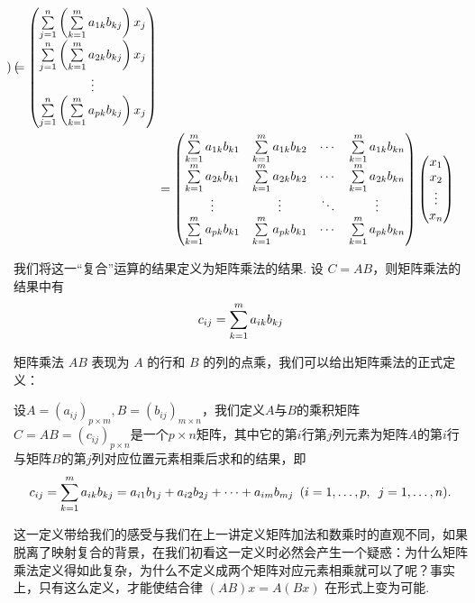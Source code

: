 \begin{align*}
\begin{pmatrix}
    \end{pmatrix} = \begin{pmatrix}
        \sum\limits_{j=1}^n\left(\sum\limits_{k=1}^m a_{1k} b_{kj}\right) x_j \\
        \sum\limits_{j=1}^n\left(\sum\limits_{k=1}^m a_{2k} b_{kj}\right) x_j \\
        \vdots \\
        \sum\limits_{j=1}^n\left(\sum\limits_{k=1}^m a_{pk} b_{kj}\right) x_j
    \end{pmatrix} \\
    &= \begin{pmatrix}
        \sum_{k=1}^m\limits a_{1k} b_{k1} & \sum_{k=1}^m\limits a_{1k} b_{k2} & \cdots & \sum_{k=1}^m\limits a_{1k} b_{kn} \\
        \sum_{k=1}^m\limits a_{2k} b_{k1} & \sum_{k=1}^m\limits a_{2k} b_{k2} & \cdots & \sum_{k=1}^m\limits a_{2k} b_{kn} \\
        \vdots & \vdots & \ddots & \vdots \\
        \sum_{k=1}^m\limits a_{pk} b_{k1} & \sum_{k=1}^m\limits a_{pk} b_{k1} & \cdots & \sum_{k=1}^m\limits a_{pk} b_{kn}
    \end{pmatrix} \begin{pmatrix}
        x_1 \\ x_2 \\ \vdots \\ x_n
    \end{pmatrix}\\
\end{align*}

我们将这一``复合''运算的结果定义为矩阵乘法的结果. 设 $C = AB$，则矩阵乘法的结果中有
\[
    c_{ij} = \sum_{k=1}^m\limits a_{ik} b_{kj}
\]

矩阵乘法 $AB$ 表现为 $A$ 的行和 $B$ 的列的点乘，我们可以给出矩阵乘法的正式定义：
\begin{definition}{}{}
    设$A=(a_{ij})_{p\times m},B=(b_{ij})_{m\times n}$，我们定义$A$与$B$的乘积矩阵$C=AB=(c_{ij})_{p\times n}$是一个$p\times n$矩阵，其中它的第$i$行第$j$列元素为矩阵$A$的第$i$行与矩阵$B$的第$j$列对应位置元素相乘后求和的结果，即
    \[
        c_{ij}
        =\sum_{k=1}^m\limits a_{ik} b_{kj}
        =a_{i1}b_{1j}+a_{i2}b_{2j}+\cdots+a_{im}b_{mj}\enspace(i=1,\ldots,p,\enspace j=1,\ldots,n).
    \]
\end{definition}

这一定义带给我们的感受与我们在上一讲定义矩阵加法和数乘时的直观不同，如果脱离了映射复合的背景，在我们初看这一定义时必然会产生一个疑惑：为什么矩阵乘法定义得如此复杂，为什么不定义成两个矩阵对应元素相乘就可以了呢？事实上，只有这么定义，才能使结合律 $(AB)x = A(Bx)$ 在形式上变为可能.

